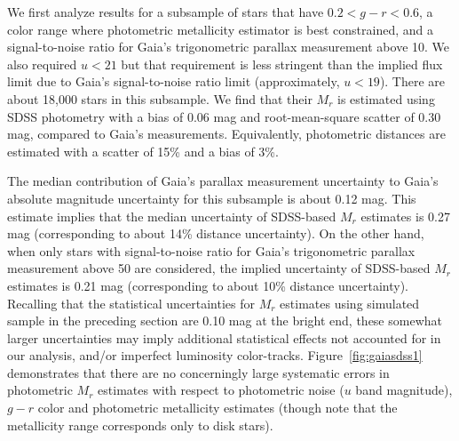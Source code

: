 We first analyze results for a subsample of stars that have $0.2 < g - r < 0.6$, a color range where photometric metallicity estimator is best constrained,
and a signal-to-noise ratio for Gaia's trigonometric
parallax measurement above 10.  We also required $u<21$ but that requirement is less stringent than the implied flux limit due to
Gaia's signal-to-noise ratio limit (approximately, $u<19$). There are about 18,000 stars in this subsample.
We find that their $M_r$ is estimated using SDSS photometry with a bias of 0.06 mag and root-mean-square scatter of 0.30 mag, compared
to Gaia's measurements. Equivalently, photometric distances  are estimated with a scatter of 15\% and a bias of 3\%.

The median contribution of Gaia's parallax measurement uncertainty to Gaia's absolute
magnitude uncertainty for this subsample is about 0.12 mag. This estimate implies that the median uncertainty of SDSS-based $M_r$
estimates is 0.27 mag (corresponding to about 14\% distance uncertainty). On the other hand, when only stars with signal-to-noise
ratio for Gaia's trigonometric parallax measurement above 50 are considered, the implied uncertainty of SDSS-based $M_r$
estimates is 0.21 mag (corresponding to about 10\% distance uncertainty).  Recalling that the statistical uncertainties for $M_r$
estimates using simulated sample in the preceding section are 0.10 mag at the bright end, these somewhat larger uncertainties may
imply additional statistical effects not accounted for in our analysis, and/or imperfect luminosity color-tracks.
Figure~\ref{fig:gaiasdss1} demonstrates that there are no concerningly large systematic errors in photometric $M_r$ estimates with
respect to photometric noise ($u$ band magnitude), $g-r$ color and photometric metallicity estimates (though note that the metallicity
range corresponds only to disk stars).

